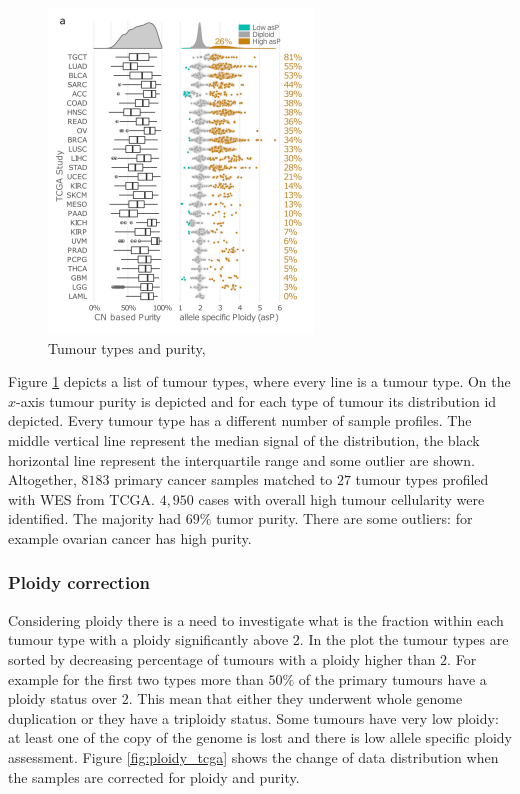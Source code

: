   \begin{figure}[H]
    \centering
    \includegraphics[width=0.5\linewidth]{image9.png}
    \caption{Tumour types and purity,}
    \label{fig:tcga}
  \end{figure}

  Figure \ref{fig:tcga} depicts a list of tumour types, where every line is a tumour type.
  On the $x$-axis tumour purity is depicted and for each type of tumour its distribution id depicted.
  Every tumour type has a different number of sample profiles.
  The middle vertical line represent the median signal of the distribution, the black horizontal line represent the interquartile range and some outlier are shown.
  Altogether, $8183$ primary cancer samples matched to $27$ tumour types profiled with WES from TCGA.
  $4,950$ cases with overall high tumour cellularity were identified.
  The majority had $69\%$ tumor purity.
  There are some outliers: for example ovarian cancer has high purity.

    \subsubsection{Ploidy correction}
    Considering ploidy there is a need to investigate what is the fraction within each tumour type with a ploidy significantly above $2.$
    In the plot the tumour types are sorted by decreasing percentage of tumours with a ploidy higher than $2$.
    For example for the first two types more than $50\%$ of the primary tumours have a ploidy status over $2$.
    This mean that either they underwent whole genome duplication or they have a triploidy status.
    Some tumours have very low ploidy: at least one of the copy of the genome is lost and there is low allele specific ploidy assessment.
    Figure \ref{fig:ploidy_tcga} shows the change of data distribution when the samples are corrected for ploidy and purity.

